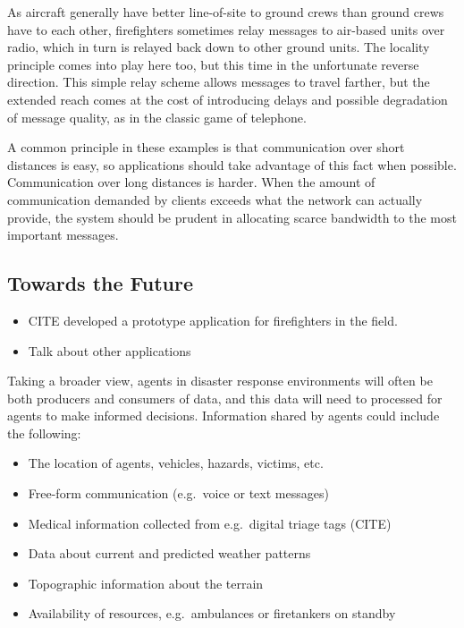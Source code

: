 \documentclass[]             %
{NASA}                       %
\theoremstyle{definition}
\providecommand{\tightlist}{%
  \setlength{\itemsep}{0pt}\setlength{\parskip}{0pt}}
\begin{document}
As aircraft generally have better line-of-site to ground crews than
ground crews have to each other, firefighters sometimes relay messages
to air-based units over radio, which in turn is relayed back down to
other ground units. The locality principle comes into play here too, but
this time in the unfortunate reverse direction. This simple relay scheme
allows messages to travel farther, but the extended reach comes at the
cost of introducing delays and possible degradation of message quality,
as in the classic game of telephone.

A common principle in these examples is that communication over short
distances is easy, so applications should take advantage of this fact
when possible. Communication over long distances is harder. When the
amount of communication demanded by clients exceeds what the network can
actually provide, the system should be prudent in allocating scarce
bandwidth to the most important messages.

\hypertarget{towards-the-future}{%
\subsection{Towards the Future}\label{towards-the-future}}

\begin{itemize}
\tightlist
\item
  CITE developed a prototype application for firefighters in the field.
\item
  Talk about other applications
\end{itemize}

Taking a broader view, agents in disaster response environments will
often be both producers and consumers of data, and this data will need
to processed for agents to make informed decisions. Information shared
by agents could include the following:

\begin{itemize}
\tightlist
\item
  The location of agents, vehicles, hazards, victims, etc.
\item
  Free-form communication (e.g.~voice or text messages)
\item
  Medical information collected from e.g.~digital triage tags (CITE)
\item
  Data about current and predicted weather patterns
\item
  Topographic information about the terrain
\item
  Availability of resources, e.g.~ambulances or firetankers on standby
\end{itemize}
\end{document}
